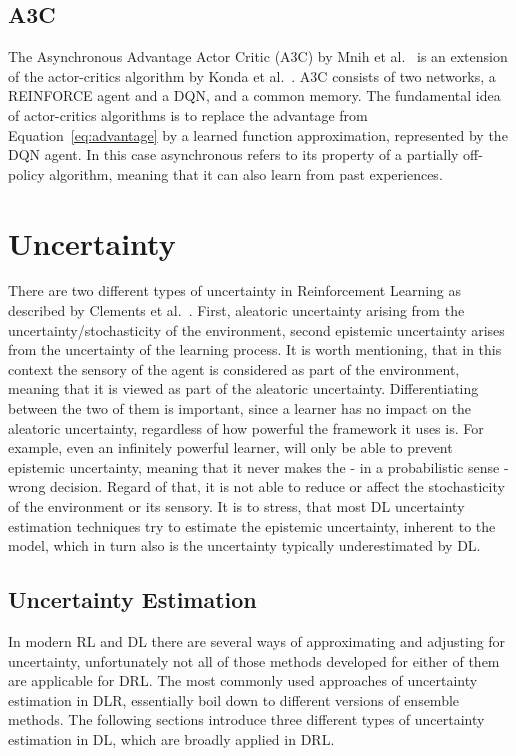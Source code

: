 \documentclass[11pt,a4paper]{article}
\begin{document}
	\subsection{A3C}\label{subsec:a3c}
	The Asynchronous Advantage Actor Critic (A3C) by Mnih et al.~\cite{mnih_asynchronous_2016} is an extension of the actor-critics algorithm by Konda et al.~\cite{konda_actor-critic_2000}.
	A3C consists of two networks, a REINFORCE agent and a DQN, and a common memory.
	The fundamental idea of actor-critics algorithms is to replace the advantage from Equation~\ref{eq:advantage} by a learned function approximation, represented by the DQN agent.
	In this case asynchronous refers to its property of a partially off-policy algorithm, meaning that it can also learn from past experiences.

	\section{Uncertainty}\label{sec:uncertainty}
	There are two different types of uncertainty in Reinforcement Learning as described by Clements et al.~\cite{clements_estimating_2020}.
	First, aleatoric uncertainty arising from the uncertainty/stochasticity of the environment, second epistemic uncertainty arises from the uncertainty of the learning process.
	It is worth mentioning, that in this context the sensory of the agent is considered as part of the environment, meaning that it is viewed as part of the aleatoric uncertainty.
	Differentiating between the two of them is important, since a learner has no impact on the aleatoric uncertainty, regardless of how powerful the framework it uses is.
	For example, even an infinitely powerful learner, will only be able to prevent epistemic uncertainty, meaning that it never makes the - in a probabilistic sense - wrong decision.
	Regard of that, it is not able to reduce or affect the stochasticity of the environment or its sensory.
	It is to stress, that most DL uncertainty estimation techniques try to estimate the epistemic uncertainty, inherent to the model, which in turn also is the uncertainty typically underestimated by DL.\\

	\subsection{Uncertainty Estimation}\label{subsec:uncertainty-estimation}
	In modern RL and DL there are several ways of approximating and adjusting for uncertainty, unfortunately not all of those methods developed for either of them are applicable for DRL.
	The most commonly used approaches of uncertainty estimation in DLR, essentially boil down to different versions of ensemble methods.
	The following sections introduce three different types of uncertainty estimation in DL, which are broadly applied in DRL.\\
\end{document}
